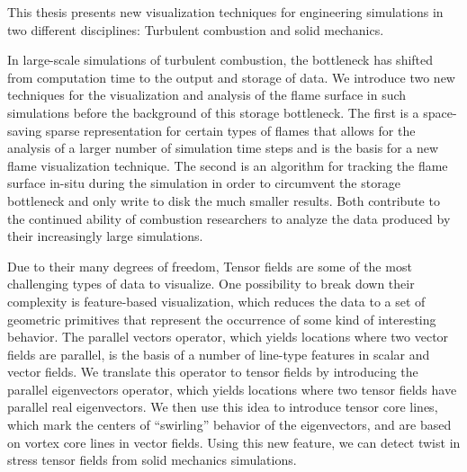 %
%
This thesis presents new visualization techniques for engineering simulations in
two different disciplines: Turbulent combustion and solid mechanics.
%

%
In large-scale simulations of turbulent combustion, the bottleneck has shifted
from computation time to the output and storage of data.
%
We introduce two new techniques for the visualization and analysis of the flame
surface in such simulations before the background of this storage bottleneck.
%
The first is a space-saving sparse representation for certain types of flames
that allows for the analysis of a larger number of simulation time steps and is
the basis for a new flame visualization technique.
%
The second is an algorithm for tracking the flame surface in-situ during the
simulation in order to circumvent the storage bottleneck and only write to disk
the much smaller results.
%
Both contribute to the continued ability of combustion researchers to analyze
the data produced by their increasingly large simulations.
%

%
Due to their many degrees of freedom, Tensor fields are some of the most
challenging types of data to visualize.
%
One possibility to break down their complexity is feature-based visualization,
which reduces the data to a set of geometric primitives that represent the
occurrence of some kind of interesting behavior.
%
The parallel vectors operator, which yields locations where two vector fields
are parallel, is the basis of a number of line-type features in scalar and
vector fields.
%
We translate this operator to tensor fields by introducing the parallel
eigenvectors operator, which yields locations where two tensor fields have
parallel real eigenvectors.
%
We then use this idea to introduce tensor core lines, which mark the centers of
``swirling'' behavior of the eigenvectors, and are based on vortex core lines in
vector fields.
%
Using this new feature, we can detect twist in stress tensor fields from solid
mechanics simulations.
%